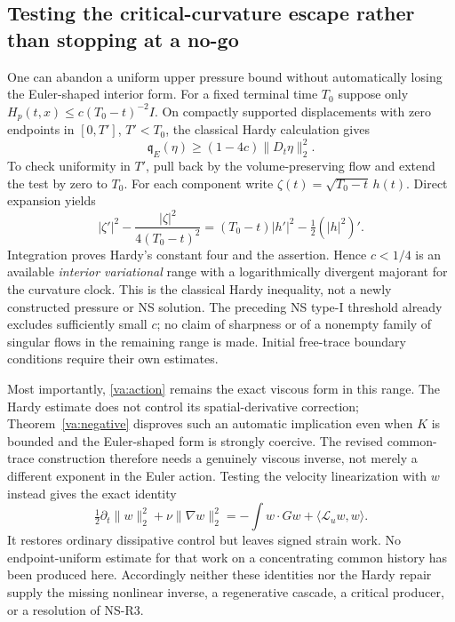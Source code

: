 \subsection{Testing the critical-curvature escape rather than stopping at a no-go}
\label{va:hardy}

One can abandon a uniform upper pressure bound without automatically losing
the Euler-shaped interior form. For a fixed terminal time $T_0$ suppose only
$H_p(t,x)\le c(T_0-t)^{-2}I$. On compactly supported displacements with zero
endpoints in $[0,T']$, $T'<T_0$, the classical Hardy calculation gives
\[
 \mathfrak q_E(\eta)\ge(1-4c)\|D_t\eta\|_2^2.
\]
To check uniformity in $T'$, pull back by the volume-preserving flow and
extend the test by zero to $T_0$. For each component write
$\zeta(t)=\sqrt{T_0-t}\,h(t)$. Direct expansion yields
\[
 |\zeta'|^2-\frac{|\zeta|^2}{4(T_0-t)^2}
 =(T_0-t)|h'|^2-\tfrac12(|h|^2)'.
\]
Integration proves Hardy's constant four and the assertion. Hence $c<1/4$
is an available \emph{interior variational} range with a logarithmically
divergent majorant for the curvature clock. This is the classical Hardy
inequality, not a newly constructed pressure or NS solution. The preceding
NS type-I threshold already excludes sufficiently small $c$; no claim of
sharpness or of a nonempty family of singular flows in the remaining range
is made. Initial free-trace boundary conditions require their own estimates.

Most importantly, \eqref{va:action} remains the exact viscous form in this
range. The Hardy estimate does not control its spatial-derivative correction;
Theorem~\ref{va:negative} disproves such an automatic implication even when
$K$ is bounded and the Euler-shaped form is strongly coercive. The revised
common-trace construction therefore needs a genuinely viscous inverse, not
merely a different exponent in the Euler action. Testing the velocity
linearization with $w$ instead gives the exact identity
\[
 \tfrac12\partial_t\|w\|_2^2+\nu\|\nabla w\|_2^2
 =-\int w\cdot G w+\langle\mathcal L_u w,w\rangle.
\]
It restores ordinary dissipative control but leaves signed strain work.
No endpoint-uniform estimate for that work on a concentrating common history
has been produced here. Accordingly neither these identities nor the Hardy
repair supply the missing nonlinear inverse, a regenerative cascade,
a critical producer, or a resolution of NS-R3.
